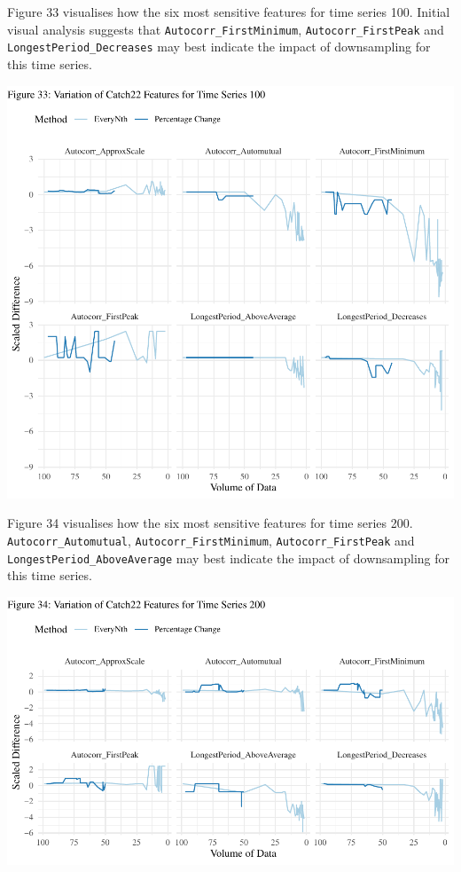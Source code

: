 \documentclass{article}
\begin{document}
Figure 33 visualises how the six most sensitive features for time series
100. Initial visual analysis suggests that
\texttt{Autocorr\_FirstMinimum}, \texttt{Autocorr\_FirstPeak} and
\texttt{LongestPeriod\_Decreases} may best indicate the impact of
downsampling for this time series.

\includegraphics{210431461_CSC8639_Dissertation_files/figure-latex/Catch22Variation100-1.pdf}

\newpage

Figure 34 visualises how the six most sensitive features for time series
200. \texttt{Autocorr\_Automutual}, \texttt{Autocorr\_FirstMinimum},
\texttt{Autocorr\_FirstPeak} and \texttt{LongestPeriod\_AboveAverage}
may best indicate the impact of downsampling for this time series.

\includegraphics{210431461_CSC8639_Dissertation_files/figure-latex/Catch22Variation200-1.pdf}
\end{document}
